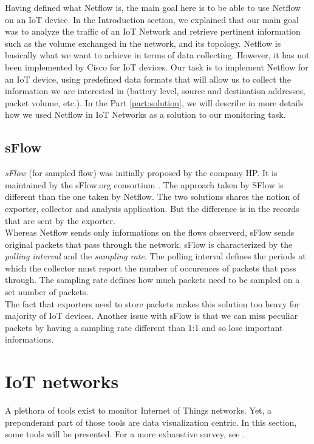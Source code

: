 Having defined what Netflow is, the main goal here is to be able to use Netflow on an IoT device. In the Introduction section, we explained that our main goal was to analyze the traffic of an IoT Network and retrieve pertinent information such as the volume exchanged in the network, and its topology. Netflow is basically what we want to achieve in terms of data collecting. However, it has not been implemented by Cisco for IoT devices. Our task is to implement Netflow for an IoT device, using predefined data formats that will allow us to collect the information we are interested in (battery level, source and destination addresses, packet volume, etc.). In the Part \ref{part:solution}, we will describe in more details how we used Netflow in IoT Networks as a solution to our monitoring task.

\subsection{sFlow}

\textit{sFlow} (for sampled flow) was initially proposed by the company HP. It is maintained by the sFlow.org consortium \cite{website:sflow}. The approach taken by SFlow is different than the one taken by Netflow. The two solutions shares the notion of exporter, collector and analysis application. But the difference is in the records that are sent by the exporter. \\

Whereas Netflow sends only informations on the flows observerd, sFlow sends original packets that pass through the network. sFlow is characterized by the \textit{polling interval} and the \textit{sampling rate}. The polling interval defines the periods at which the collector must report the number of occurences of packets that pass through. The sampling rate defines how much packets need to be sampled on a set number of packets. \\

The fact that exporters need to store packets makes this solution too heavy for majority of IoT devices. Another issue with sFlow is that we can miss peculiar packets by having a sampling rate different than 1:1 and so lose important informations.

\section{IoT networks}

A plethora of tools exist to monitor Internet of Things networks. Yet, a preponderant part of those tools are data visualization centric. In this section, some tools will be presented. For a more exhaustive survey, see \cite{parbat2010data}.

